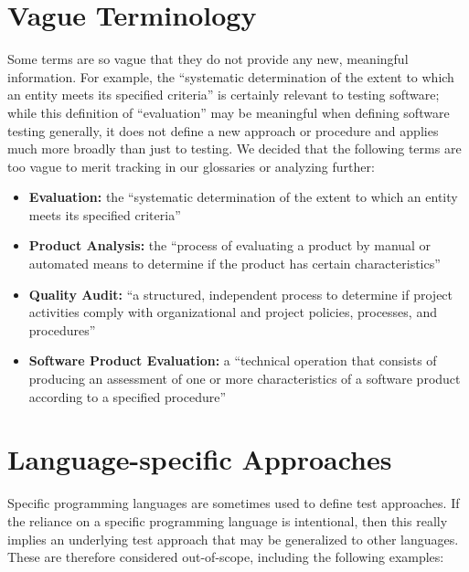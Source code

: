 \section{Vague Terminology}\label{vague-terms}

Some terms are so vague that they do not provide any new, meaningful
information. For example, the ``systematic determination of the extent to
which an entity meets its specified criteria'' \citep[p.~167]{IEEE2017} is
certainly relevant to testing software; while this definition of
``evaluation'' may be meaningful when defining software testing generally,
it does not define a new approach or procedure and applies much more
broadly than just to testing. We decided that the
following terms are too vague to merit tracking in our glossaries or
analyzing further:
\begin{itemize}
    \item \textbf{Evaluation:} the ``systematic determination of the extent
          to which an entity meets its specified criteria''
          \citep[p.~167]{IEEE2017}
    \item \textbf{Product Analysis:} the ``process of evaluating a product by
          manual or automated means to determine if the product has certain
          characteristics'' \citep[p.~343]{IEEE2017}
    \item \textbf{Quality Audit:} ``a structured, independent process to
          determine if project activities comply with organizational and
          project policies, processes, and procedures'' \citep[p.~247]{PMBOK2013}
    \item \textbf{Software Product Evaluation:} a ``technical operation that
          consists of producing an assessment of one or more characteristics
          of a software product according to a specified procedure''
          \citep[p.~424]{IEEE2017}
\end{itemize}

\section{Language-specific Approaches}\label{lang-test}
Specific programming languages are sometimes used to define test approaches.
If the reliance on a specific programming language is intentional, then
this really implies an underlying test approach that may be generalized to
other languages. These are therefore considered out-of-scope,
including the following examples:

